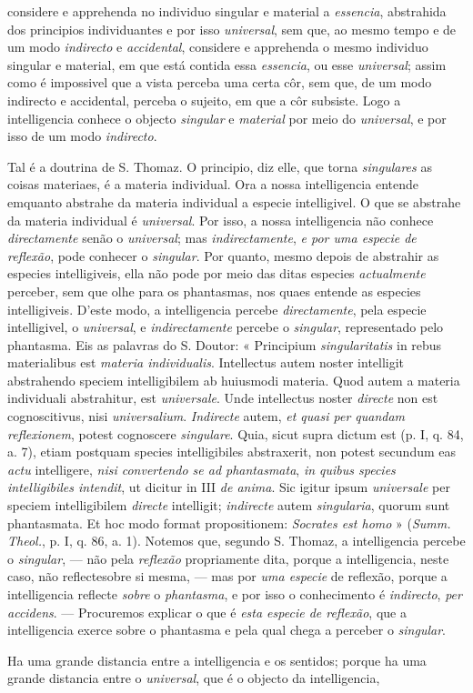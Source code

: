 considere e apprehenda no individuo singular e material a \emph{essencia}, abstrahida dos principios individuantes e por isso \emph{universal}, sem que, ao mesmo tempo e de um modo \emph{indirecto} e \emph{accidental}, considere e apprehenda o mesmo individuo singular e material, em que está contida essa \emph{essencia}, ou esse \emph{universal}; assim como é impossivel que a vista perceba uma certa côr, sem que, de um modo indirecto e accidental, perceba o sujeito, em que a côr subsiste. Logo a intelligencia conhece o objecto \emph{singular} e \emph{material} por meio do \emph{universal}, e por isso de um modo \emph{indirecto}.\par Tal é a doutrina de S. Thomaz. O principio, diz elle, que torna \emph{singulares} as coisas materiaes, é a materia individual. Ora a nossa intelligencia entende emquanto abstrahe da materia individual a especie intelligivel. O que se abstrahe da materia individual é \emph{universal}. Por isso, a nossa intelligencia não conhece \emph{directamente} senão o \emph{universal}; mas \emph{indirectamente}, \emph{e por uma especie de reflexão}, pode conhecer o \emph{singular}. Por quanto, mesmo depois de abstrahir as especies intelligiveis, ella não pode por meio das ditas especies \emph{actualmente} perceber, sem que olhe para os phantasmas, nos quaes entende as especies intelligiveis. D'este modo, a intelligencia percebe \emph{directamente}, pela especie intelligivel, o \emph{universal}, e \emph{indirectamente} percebe o \emph{singular}, representado pelo phantasma. Eis as palavras do S. Doutor: « Principium \emph{singularitatis} in rebus materialibus est \emph{materia individualis}. Intellectus autem noster intelligit abstrahendo speciem intelligibilem ab huiusmodi materia. Quod autem a materia individuali abstrahitur, est \emph{universale}. Unde intellectus noster \emph{directe} non est cognoscitivus, nisi \emph{universalium}. \emph{Indirecte} autem, \emph{et quasi per quandam reflexionem}, potest cognoscere \emph{singulare}. Quia, sicut supra dictum est (p. I, q. 84, a. 7), etiam postquam species intelligibiles abstraxerit, non potest secundum eas \emph{actu} intelligere, \emph{nisi convertendo se ad phantasmata}, \emph{in quibus species intelligibiles intendit}, ut dicitur in III \emph{de anima}. Sic igitur ipsum \emph{universale} per speciem intelligibilem \emph{directe} intelligit; \emph{indirecte} autem \emph{singularia}, quorum sunt phantasmata. Et hoc modo format propositionem: \emph{Socrates est homo} » (\emph{Summ. Theol.}, p. I, q. 86, a. 1). Notemos que, segundo S. Thomaz, a intelligencia percebe o \emph{singular}, --- não pela \emph{reflexão} propriamente dita, porque a intelligencia, neste caso, não reflectesobre si mesma, --- mas por \emph{uma especie} de reflexão, porque a intelligencia reflecte \emph{sobre} o \emph{phantasma}, e por isso o conhecimento é \emph{indirecto}, \emph{per accidens}. --- Procuremos explicar o que é \emph{esta especie de reflexão}, que a intelligencia exerce sobre o phantasma e pela qual chega a perceber o \emph{singular}.\par Ha uma grande distancia entre a intelligencia e os sentidos; porque ha uma grande distancia entre o \emph{universal}, que é o objecto da intelligencia, 